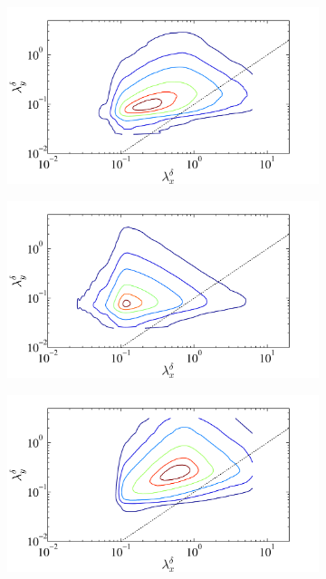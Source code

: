 \begin{figure}
\centering
        \begin{subfigure}[t]{0.5\textwidth}
                \includegraphics[width=\linewidth]{Fig2/energy_contour_ABL_n05_filt2_level2.pdf}
                \caption{}
                \label{fig:energy1}
        \end{subfigure}%
        \centering
        \begin{subfigure}[t]{0.5\textwidth}
                \includegraphics[width=\linewidth]{Fig2/dissp_contour_ABL_n05_filt2_level2.pdf}
                \caption{}
                \label{fig:dissip1}
        \end{subfigure}
\centering
        \begin{subfigure}[t]{0.5\textwidth}
                \includegraphics[width=\linewidth]{Fig2/energy_contour_ABL_n05_filt2_level4.pdf}

\end{subfigure}
\end{figure}
